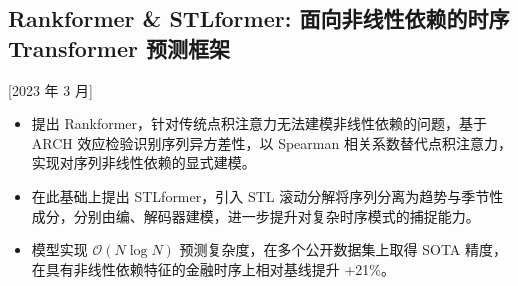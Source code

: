 \documentclass{mycv}
\begin{document}

\subsection{Rankformer \& STLformer: 面向非线性依赖的时序 Transformer 预测框架}[2023 年 3 月]

\begin{itemize}
  \itemsep 0.4em
  \item 提出 Rankformer，针对传统点积注意力无法建模非线性依赖的问题，基于 ARCH 效应检验识别序列异方差性，以 Spearman 相关系数替代点积注意力，实现对序列非线性依赖的显式建模。
  \item 在此基础上提出 STLformer，引入 STL 滚动分解将序列分离为趋势与季节性成分，分别由编、解码器建模，进一步提升对复杂时序模式的捕捉能力。
  \item 模型实现 $\mathcal{O}(N \log{N})$ 预测复杂度，在多个公开数据集上取得 SOTA 精度，在具有非线性依赖特征的金融时序上相对基线提升 +21\%。
\end{itemize}





\end{document}

